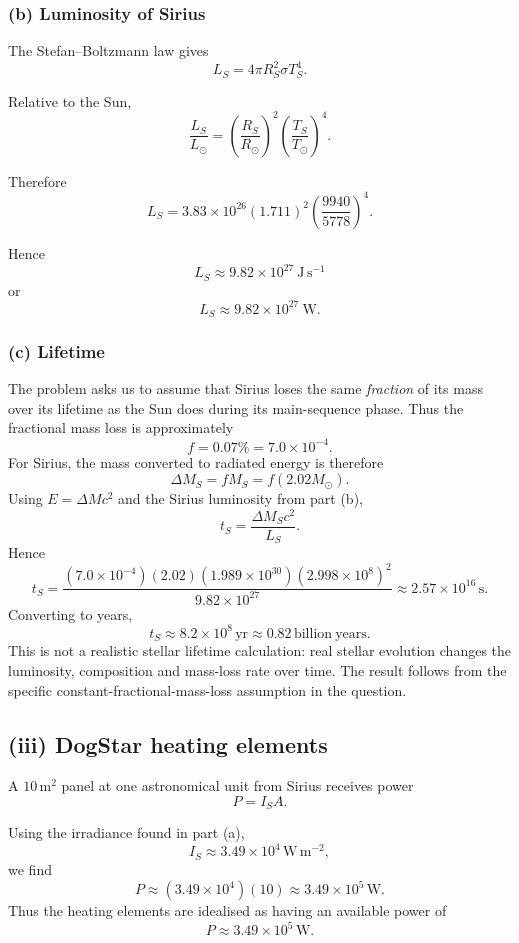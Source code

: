 \documentclass[11pt,a4paper]{article}
\begin{document}
\subsubsection*{(b) Luminosity of Sirius}

The Stefan--Boltzmann law gives
\[
L_S=4\pi R_S^2\sigma T_S^4.
\]

Relative to the Sun,
\[
\frac{L_S}{L_\odot}
=
\left(\frac{R_S}{R_\odot}\right)^2
\left(\frac{T_S}{T_\odot}\right)^4.
\]

Therefore
\[
L_S
=
3.83\times10^{26}
(1.711)^2
\left(\frac{9940}{5778}\right)^4.
\]

Hence
\[
\boxed{L_S\approx9.82\times10^{27}\ \mathrm{J\,s^{-1}}}
\]
or
\[
\boxed{L_S\approx9.82\times10^{27}\ \mathrm W}.
\]

\subsubsection*{(c) Lifetime}

The problem asks us to assume that Sirius loses the same \emph{fraction} of its
mass over its lifetime as the Sun does during its main-sequence phase. Thus the
fractional mass loss is approximately
\[
f=0.07\%=7.0\times10^{-4}.
\]
For Sirius, the mass converted to radiated energy is therefore
\[
\Delta M_S=fM_S=f(2.02M_\odot).
\]
Using $E=\Delta Mc^2$ and the Sirius luminosity from part (b),
\[
t_S=\frac{\Delta M_Sc^2}{L_S}.
\]
Hence
\[
t_S
=\frac{(7.0\times10^{-4})(2.02)(1.989\times10^{30})(2.998\times10^8)^2}
{9.82\times10^{27}}
\approx2.57\times10^{16}\,\mathrm{s}.
\]
Converting to years,
\[
\boxed{t_S\approx8.2\times10^8\,\mathrm{yr}\approx0.82\,\mathrm{billion\ years}}.
\]
This is not a realistic stellar lifetime calculation: real stellar evolution changes the
luminosity, composition and mass-loss rate over time. The result follows from the
specific constant-fractional-mass-loss assumption in the question.

\subsection{(iii) DogStar heating elements}

A $10\,\mathrm{m^2}$ panel at one astronomical unit from Sirius receives power
\[
P=I_S A.
\]

Using the irradiance found in part (a),
\[
I_S\approx3.49\times10^4\,\mathrm{W\,m^{-2}},
\]
we find
\[
P
\approx
(3.49\times10^4)(10)
\approx3.49\times10^5\,\mathrm W.
\]
Thus the heating elements are idealised as having an available power of
\[
\boxed{P\approx3.49\times10^5\,\mathrm W}.
\]
\end{document}
